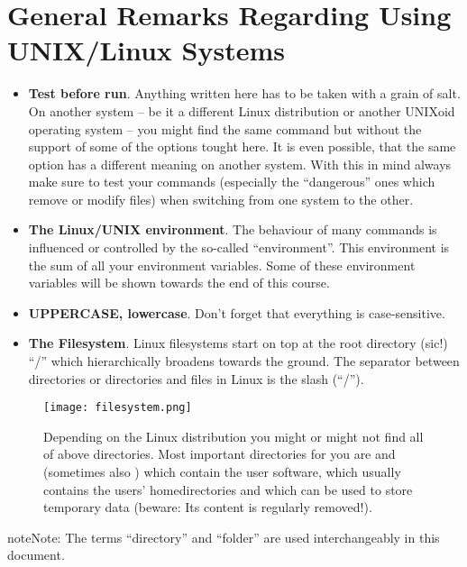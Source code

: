 \documentclass[a4paper,11pt,english]{sphinxmanual}
\begin{document}
\section{General Remarks Regarding Using UNIX/Linux Systems}
\label{introduction:general-remarks-regarding-using-unix-linux-systems}\begin{itemize}
\item {} 
\textbf{Test before run}. Anything written here has to be taken with a grain of salt. On another system – be it a different Linux distribution or another UNIXoid operating system – you might find the same command but without the support of some of the options tought here. It is even possible, that the same option has a different meaning on another system. With this in mind always make sure to test your commands (especially the “dangerous” ones which remove or modify files) when switching from one system to the other.

\item {} 
\textbf{The Linux/UNIX environment}. The behaviour of many commands is influenced or controlled by the so-called “environment”. This environment is the sum of all your environment variables. Some of these environment variables will be shown towards the end of this course.

\item {} 
\textbf{UPPERCASE, lowercase}. Don’t forget that everything is case-sensitive.

\item {} 
\textbf{The Filesystem}. Linux filesystems start on top at the root directory (sic!) “/” which hierarchically broadens towards the ground.  The separator between directories or directories and files in Linux is the slash (“/”).

\end{itemize}
\begin{figure}[htbp]
\centering
\capstart

\texttt{[image: filesystem.png]}
\caption{Depending on the Linux distribution you might or might not find all of above
directories. Most important directories for you are  and 
(sometimes also ) which contain the user software,  which
usually contains the users’ homedirectories and  which can be used to store
temporary data (beware: Its content is regularly removed!).}\label{introduction:figure-filesystem}\end{figure}

\begin{notice}{note}{Note:}
The terms “directory” and “folder” are used interchangeably in this document.
\end{notice}
\end{document}
